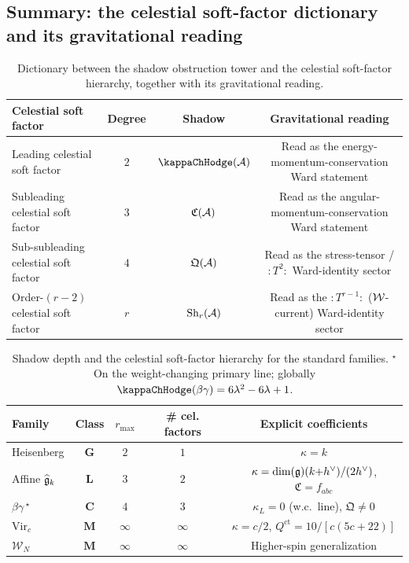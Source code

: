 %
%

\subsection{Summary: the celestial soft-factor dictionary and its gravitational reading}

\begin{table}[h]
\centering
\small
\renewcommand{\arraystretch}{1.25}
\begin{tabular}{lccc}
\toprule
\textbf{Celestial soft factor} &
\textbf{Degree} &
\textbf{Shadow} &
\textbf{Gravitational reading} \\
\midrule
Leading celestial soft factor &
 $2$ & $\kappaChHodge(\cA)$ &
 Read as the energy-momentum-conservation Ward statement \\
Subleading celestial soft factor &
 $3$ & $\mathfrak{C}(\mathcal{A})$ &
 Read as the angular-momentum-conservation Ward statement \\
Sub-subleading celestial soft factor &
 $4$ & $\mathfrak{Q}(\mathcal{A})$ &
 Read as the stress-tensor / $:T^2:$ Ward-identity sector \\
Order-$(r-2)$ celestial soft factor &
 $r$ & $\operatorname{Sh}_r(\mathcal{A})$ &
 Read as the $:T^{r-1}:$ ($\mathcal{W}$-current) Ward-identity sector \\
\bottomrule
\end{tabular}
\caption{Dictionary between the shadow obstruction tower and the
celestial soft-factor hierarchy, together with its gravitational
reading.}
\label{tab:thqg-VI-soft-dictionary}
\end{table}

\begin{table}[h]
\centering
\small
\renewcommand{\arraystretch}{1.25}
\begin{tabular}{lcccc}
\toprule
\textbf{Family} &
\textbf{Class} &
$r_{\max}$ &
\textbf{\# cel. factors} &
\textbf{Explicit coefficients} \\
\midrule
Heisenberg &
 $\mathbf{G}$ & $2$ & $1$ &
 $\kappa = k$ \\
Affine $\widehat{\mathfrak{g}}_k$ &
 $\mathbf{L}$ & $3$ & $2$ &
 $\kappa = \dim(\mathfrak{g})(k{+}h^\vee)/(2h^\vee)$, $\mathfrak{C} = f_{abc}$ \\
$\beta\gamma$\,$^\star$ &
 $\mathbf{C}$ & $4$ & $3$ &
 $\kappa_L = 0$ (w.c.\ line), $\mathfrak{Q} \neq 0$ \\
$\mathrm{Vir}_c$ &
 $\mathbf{M}$ & $\infty$ & $\infty$ &
 $\kappa = c/2$, $Q^{\mathrm{ct}} = 10/[c(5c+22)]$ \\
$\mathcal{W}_N$ &
 $\mathbf{M}$ & $\infty$ & $\infty$ &
 Higher-spin generalization \\
\bottomrule
\end{tabular}
\caption{Shadow depth and the celestial soft-factor hierarchy for the
standard families. ${}^\star$On the weight-changing primary line;
globally $\kappaChHodge(\beta\gamma) = 6\lambda^2 - 6\lambda + 1$.}
\end{table}

